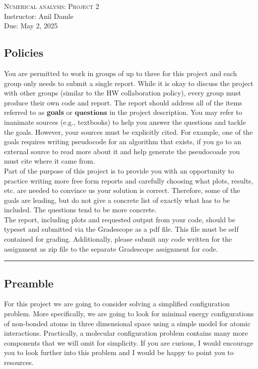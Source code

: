 \documentclass[11pt,onecolumn]{article}
\begin{document}
\noindent
\textsc{\Large Numerical analysis: Project 2}\\
Instructor: Anil Damle\\
Due: May 2, 2025\\

\subsection*{Policies}
You are permitted to work in groups of up to three for this project and each group only needs to submit a single report. While it is okay to discuss the project with other groups (similar to the HW collaboration policy), every group must produce their own code and report. The report should address all of the items referred to as \textbf{goals} or $\textbf{questions}$ in the project description. You may refer to inanimate sources (e.g., textbooks) to help you answer the questions and tackle the goals. However, your sources must be explicitly cited. For example, one of the goals requires writing pseudocode for an algorithm that exists, if you go to an external source to read more about it and help generate the pseudocoade you must cite where it came from.\\ 


\noindent
Part of the purpose of this project is to provide you with an opportunity to practice writing more free form reports and carefully choosing what plots, results, etc. are needed to convince us your solution is correct. Therefore, some of the goals are leading, but do not give a concrete list of exactly what has to be included. The questions tend to be more concrete.\\

\noindent
The report, including plots and requested output from your code,
should be typeset and submitted via the Gradescope as a pdf file. This file must be self contained for grading. Additionally, please
submit any code written for the assignment as zip
file to the separate Gradescope assignment for code.\\
\hrule
\vspace{1cm}
\noindent

\subsection*{Preamble}

For this project we are going to consider solving a simplified configuration problem. More specifically, we are going to look for minimal energy configurations of non-bonded atoms in three dimensional space using a simple model for atomic interactions. Practically, a molecular configuration problem contains many more components that we will omit for simplicity. If you are curious, I would encourage you to look further into this problem and I would be happy to point you to resources.
\end{document}

